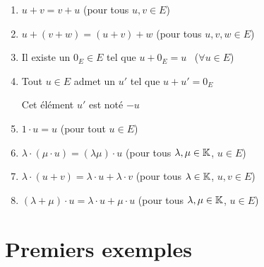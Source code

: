 \begin{frame}
 \begin{enumerate}[<+->] \setlength{\itemsep}{6pt}
 \item $u + v = v + u$ \quad (pour tous $u,v \in E$)
 \item $u + (v+w) = (u+v) +w$ \quad (pour tous $u,v,w \in E$)
 \item Il existe un  $0_E \in E$ tel que $u + 0_E = u$ \ ($\forall u \in E$)
 \item Tout $u \in E$ admet un  $u'$ tel que $u + u' = 0_E$
 
 Cet élément $u'$ est noté $-u$
 \item $1 \cdot u = u$ \quad (pour tout $u \in E$)
 \item $\lambda \cdot (\mu \cdot u) = (\lambda\mu )\cdot u$ \quad (pour tous $\lambda, \mu \in \mathbb{K}$, $u \in E$)
 \item $\lambda \cdot (u+v) = \lambda \cdot u + \lambda \cdot v$ \quad (pour tous $\lambda \in \mathbb{K}$, $u,v \in E$)
 \item $(\lambda + \mu ) \cdot u = \lambda \cdot u + \mu \cdot u$ \quad (pour tous $\lambda,\mu \in \mathbb{K}$, $u \in E$)
 \end{enumerate} 

\end{frame}


\section{Premiers exemples}

